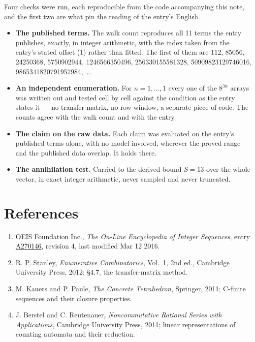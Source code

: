 \documentclass[11pt]{article}
\theoremstyle{definition}
\begin{document}
Four checks were run, each reproducible from the code accompanying this note, and the first two are what pin the reading of the entry's English.

\begin{itemize}

\item {\bfseries The published terms.} The walk count reproduces all 11 terms the entry publishes, exactly, in integer arithmetic, with the index taken from the entry's stated offset (1) rather than fitted. The first of them are 112, 85056, 24250368, 5750902944, 1246566350496, 256330155581328, 50909823129746016, 9865341820791957984,~\dots

\item {\bfseries An independent enumeration.} For $n = 1,\dots,1$ every one of the $8^{3n}$ arrays was written out and tested cell by cell against the condition as the entry states it --- no transfer matrix, no row window, a separate piece of code. The counts agree with the walk count and with the entry.

\item {\bfseries The claim on the raw data.} Each claim was evaluated on the entry's published terms alone, with no model involved, wherever the proved range and the published data overlap. It holds there.

\item {\bfseries The annihilation test.} Carried to the derived bound $S = 13$ over the whole vector, in exact integer arithmetic, never sampled and never truncated.

\end{itemize}

\section{References}

\begin{enumerate}

\item OEIS Foundation Inc., \emph{The On-Line Encyclopedia of Integer Sequences}, entry \href{https://oeis.org/A270146}{A270146}, revision 4, last modified Mar 12 2016.

\item R. P. Stanley, \emph{Enumerative Combinatorics}, Vol.~1, 2nd ed., Cambridge University Press, 2012; \S4.7, the transfer-matrix method.

\item M. Kauers and P. Paule, \emph{The Concrete Tetrahedron}, Springer, 2011; C-finite sequences and their closure properties.

\item J. Berstel and C. Reutenauer, \emph{Noncommutative Rational Series with Applications}, Cambridge University Press, 2011; linear representations of counting automata and their reduction.

\end{enumerate}
\end{document}
